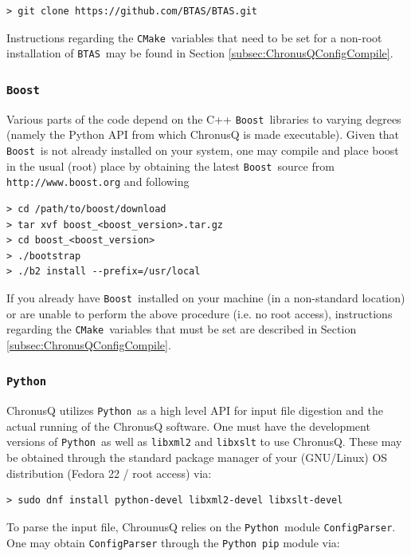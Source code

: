 \documentclass[12pt]{article}
\newcommand{\CMake}{\texttt{CMake}}
\newcommand{\BTAS}{\texttt{BTAS}}
\newcommand{\Boost}{\texttt{Boost}}
\newcommand{\Python}{\texttt{Python}}
\begin{document}
	\begin{lstlisting}
> git clone https://github.com/BTAS/BTAS.git
	\end{lstlisting}

	\noindent Instructions regarding the \CMake~variables that need to be set 
	for a non-root installation of \BTAS~may be found in Section 
	\ref{subsec:ChronusQConfigCompile}.

      \subsubsection{\Boost} \label{subsubsec:boost} 
        Various parts of the code depend on the C++ \Boost~libraries to
        varying degrees (namely the Python API from which ChronusQ is made 
	executable). Given that \Boost~is not already installed on your system,
	one may compile and place boost in the usual (root) place by obtaining
	the latest \Boost~source from \texttt{http://www.boost.org} and following

        \begin{lstlisting}
> cd /path/to/boost/download
> tar xvf boost_<boost_version>.tar.gz
> cd boost_<boost_version>
> ./bootstrap
> ./b2 install --prefix=/usr/local
        \end{lstlisting}

	\noindent If you already have \Boost~installed on your machine (in a 
	non-standard location) or are unable to perform the above procedure (i.e. 
	no root access), instructions regarding the \CMake~variables that must be 
	set are described in Section \ref{subsec:ChronusQConfigCompile}.

      \subsubsection{\Python} \label{subsubsec:Python} 
        ChronusQ utilizes \Python~as a high level API for input
        file digestion and the actual running of the ChronusQ software. One
	must have the development versions of \Python~as well as \texttt{libxml2} 
	and \texttt{libxslt} to use ChronusQ. These may be obtained through the 
	standard package manager of your (GNU/Linux) OS distribution (Fedora 22 /
	root access) via:

	\begin{lstlisting}
> sudo dnf install python-devel libxml2-devel libxslt-devel
	\end{lstlisting}

        \noindent To parse the input file, ChrounusQ relies on the \Python~module 
	\texttt{ConfigParser}. One may obtain \texttt{ConfigParser} through
	the \Python~\texttt{pip} module via:
	 
\end{document}
